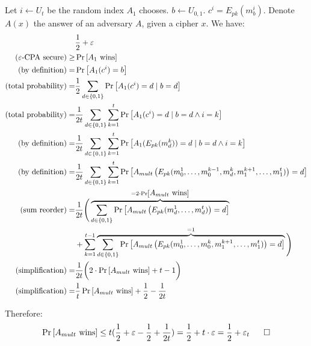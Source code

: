 \documentclass{article}
\begin{document}
\section{} %
Let $i \leftarrow U_t$ be the random index $A_1$ chooses. $b \leftarrow U_{0,1}$. $c^i = E_{pk}(m_b^i)$. Denote $A(x)$ the answer of an adversary $A$, given a cipher $x$. We have:
\begin{align*}
&\frac{1}{2} + \varepsilon \\
\mbox{(\ensuremath{\varepsilon}-CPA secure)} \ge &\Pr\left[\mbox{\ensuremath{A_1} wins}\right] \\
\mbox{(by definition)} = &\Pr\left[A_1(c^i)=b\right] \\
\mbox{(total probability)} = &\frac{1}{2} \sum_{d \in \{0,1\}} \Pr\left[A_1(c^i)=d \mid b=d\right] \\
\mbox{(total probability)} = &\frac{1}{2t} \sum_{d \in \{0,1\}} \sum_{k=1}^t \Pr\left[A_1(c^i)=d \mid b=d \wedge i=k\right] \\
\mbox{(by definition)} =  &\frac{1}{2t} \sum_{d \in \{0,1\}} \sum_{k=1}^t \Pr\left[A_1(E_{pk}(m_d^k))=d \mid b=d \wedge i=k\right] \\
\mbox{(by definition)} =  &\frac{1}{2t} \sum_{d \in \{0,1\}} \sum_{k=1}^t \Pr\left[A_{mult}\left(E_{pk}(m_0^1, \ldots, m_0^{k-1}, m_d^k, m_1^{k+1}, \ldots, m_1^t)\right)=d\right] \\
\mbox{(sum reorder)} = &\frac{1}{2t} \Bigg{(}
	\overbrace{\sum_{d \in \{0,1\}} \Pr\left[A_{mult}\left(E_{pk}(m_d^1, \ldots, m_d^t)\right)=d\right]}^{=2 \cdot \Pr\left[\mbox{\ensuremath{A_{mult}} wins}\right]} \\
& + \sum_{k=1}^{t-1} \overbrace{\sum_{d \in \{0,1\}} \Pr\left[A_{mult}\left(E_{pk}(m_0^1, \ldots, m_0^k, m_1^{k+1}, \ldots, m_1^t)\right)=d\right]}^{=1}
 \Bigg{)} \\
\mbox{(simplification)} = &\frac{1}{2t} \bigg{(} 2 \cdot \Pr\left[\mbox{\ensuremath{A_{mult}} wins}\right] + t-1 \bigg{)} \\
\mbox{(simplification)} = &\frac{1}{t} \Pr\left[\mbox{\ensuremath{A_{mult}} wins}\right] + \frac{1}{2} - \frac{1}{2t}
\end{align*}

Therefore:
\begin{align*}
\Pr\left[\mbox{\ensuremath{A_{mult}} wins}\right] 
\le t(\frac{1}{2} + \varepsilon - \frac{1}{2} + \frac{1}{2t})
= \frac{1}{2} + t \cdot \varepsilon
= \frac{1}{2} + \varepsilon_t
\ \ \ \ \ \square
\end{align*}
\end{document}
